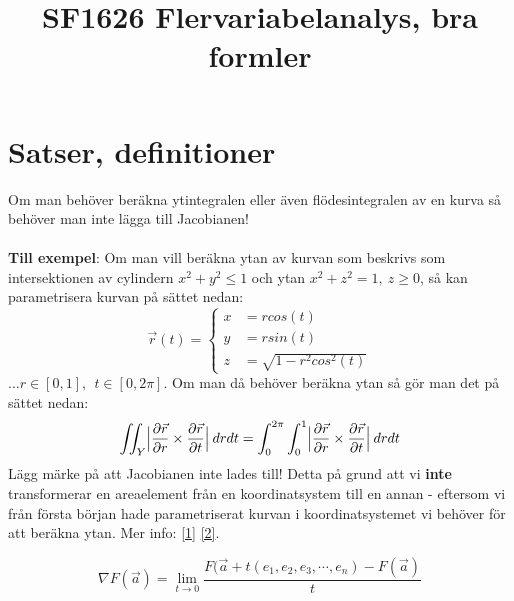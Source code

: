 \documentclass{report}
\title{\Huge{SF1626 Flervariabelanalys, bra formler}}
\author{\huge{}}
\date{}
\begin{document}
\maketitle
\newpage
\pagebreak

\chapter{Satser, definitioner}
{
	Om man behöver beräkna ytintegralen eller även flödesintegralen av en kurva så behöver man inte lägga till Jacobianen!\\\\
	
	\textbf{Till exempel}: Om man vill beräkna ytan av kurvan som beskrivs som intersektionen av cylindern $ x^2+y^2 \le 1$ och ytan $x^2+z^2 = 1, \: z \ge 0$, så kan parametrisera kurvan på sättet nedan:
	\begin{equation*}
	\vec{r}(t) =
	\begin{cases}
		x &= rcos(t)\\
		y &= rsin(t)\\
		z &= \sqrt{1-r^2cos^2(t)}
	\end{cases}
	\end{equation*}
	...$r \in [0,1], \:\: t \in [0, 2\pi]$. Om man då behöver beräkna ytan så gör man det på sättet nedan:
	\begin{equation*}
		\iint_Y \Bigl| \frac{\partial \vec{r}}{\partial r} \times \frac{\partial \vec{r}}{\partial t} \Bigr| \: drdt = \int_0^{2\pi}\int_0^1 \Bigl| \frac{\partial \vec{r}}{\partial r} \times \frac{\partial \vec{r}}{\partial t} \Bigr| \: drdt
	\end{equation*}
	Lägg märke på att Jacobianen inte lades till! Detta på grund att vi \textbf{inte} transformerar en areaelement från en koordinatsystem till en annan - eftersom vi från första början hade parametriserat kurvan i koordinatsystemet vi behöver för att beräkna ytan. Mer info: \href{https://math.stackexchange.com/questions/2388245/why-is-there-no-jacobian-in-the-definition-of-the-surface-integral-iint-ufds}{[1]} \href{https://math.stackexchange.com/a/2332951}{[2]}. 
}

{
	\begin{equation*}
		\nabla F( \vec{a} ) = \lim_{t \to 0} \frac{ F(\vec{a} + t(e_1, e_2, e_3, \cdots, e_n) - F(\vec{a}) }{t}
	\end{equation*}
}
\end{document}
